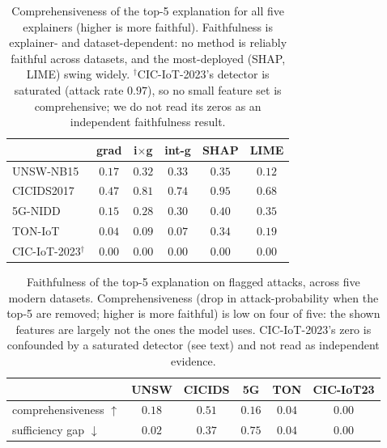 \documentclass[conference]{IEEEtran}
\begin{document}
\begin{table}[t]
\centering
\caption{Comprehensiveness of the top-5 explanation for all five explainers (higher is more
faithful). Faithfulness is explainer- and dataset-dependent: no method is reliably faithful
across datasets, and the most-deployed (SHAP, LIME) swing widely. $^\dagger$CIC-IoT-2023's
detector is saturated (attack rate $0.97$), so no small feature set is comprehensive; we do not
read its zeros as an independent faithfulness result.}
\label{tab:faith5}
\small\setlength{\tabcolsep}{4pt}
\begin{tabular}{lccccc}
\toprule
& grad & i$\times$g & int-g & SHAP & LIME \\
\midrule
UNSW-NB15  & $0.17$ & $0.32$ & $0.33$ & $0.35$ & $0.12$ \\
CICIDS2017 & $0.47$ & $0.81$ & $0.74$ & $\mathbf{0.95}$ & $0.68$ \\
5G-NIDD    & $0.15$ & $0.28$ & $0.30$ & $0.40$ & $0.35$ \\
TON-IoT    & $\mathbf{0.04}$ & $0.09$ & $0.07$ & $0.34$ & $0.19$ \\
CIC-IoT-2023$^\dagger$ & $0.00$ & $0.00$ & $0.00$ & $0.00$ & $0.00$ \\
\bottomrule
\end{tabular}
\end{table}

\begin{table}[t]
\centering
\caption{Faithfulness of the top-5 explanation on flagged attacks, across five modern datasets.
Comprehensiveness (drop in attack-probability when the top-5 are removed; higher is more
faithful) is low on four of five: the shown features are largely not the ones the model uses.
CIC-IoT-2023's zero is confounded by a saturated detector (see text) and not read as independent evidence.}
\label{tab:faith}
\small\setlength{\tabcolsep}{3.5pt}
\begin{tabular}{lccccc}
\toprule
& UNSW & CICIDS & 5G & TON & CIC-IoT23 \\
\midrule
comprehensiveness $\uparrow$ & $0.18$ & $0.51$ & $0.16$ & $0.04$ & $\mathbf{0.00}$ \\
sufficiency gap $\downarrow$  & $0.02$ & $0.37$ & $0.75$ & $0.04$ & $0.00$ \\
\bottomrule
\end{tabular}
\end{table}

\end{document}
